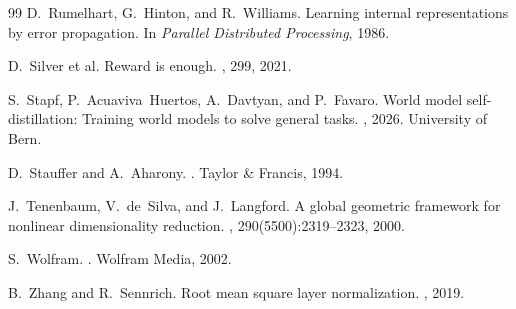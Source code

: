 \documentclass[12pt, a4paper]{article}
\theoremstyle{plain}
\theoremstyle{definition}
\theoremstyle{remark}
\begin{document}
\begin{thebibliography}{99}
D.~Rumelhart, G.~Hinton, and R.~Williams.
\newblock Learning internal representations by error propagation.
\newblock In {\em Parallel Distributed Processing}, 1986.

D.~Silver et al.
\newblock Reward is enough.
, 299, 2021.

S.~Stapf, P.~Acuaviva~Huertos, A.~Davtyan, and P.~Favaro.
\newblock World model self-distillation: Training world models to solve general
  tasks.
, 2026.
\newblock University of Bern.

D.~Stauffer and A.~Aharony.
.
\newblock Taylor \& Francis, 1994.

J.~Tenenbaum, V.~de~Silva, and J.~Langford.
\newblock A global geometric framework for nonlinear dimensionality reduction.
, 290(5500):2319--2323, 2000.

S.~Wolfram.
.
\newblock Wolfram Media, 2002.

B.~Zhang and R.~Sennrich.
\newblock Root mean square layer normalization.
, 2019.

\end{thebibliography}
\end{document}
